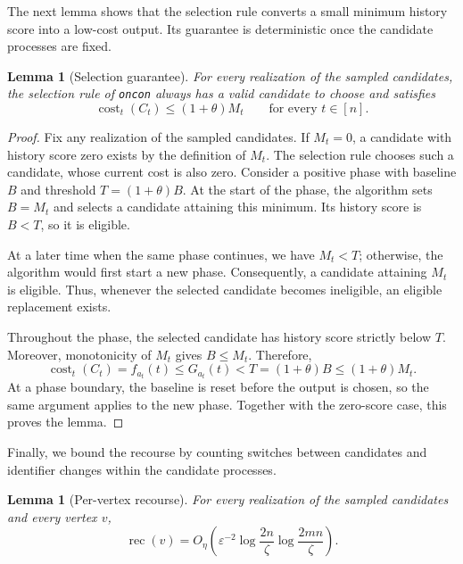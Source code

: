 \documentclass[11pt]{article}
\newtheorem{lemma}[theorem]{Lemma}
\theoremstyle{definition}
\theoremstyle{remark}
\newcommand{\cost}{\operatorname{cost}}
\newcommand{\1}{\mathbf{1}}
\begin{document}
The next lemma shows that the selection rule converts a small
minimum history score into a low-cost output. Its guarantee is
deterministic once the candidate processes are fixed.

\begin{lemma}[Selection guarantee]
\label{lem:oncon-selection}
For every realization of the sampled candidates, the selection
rule of \texttt{oncon} always has a valid candidate to choose and
satisfies
\[
    \cost_t(C_t)\leq(1+\theta)M_t
    \qquad\text{for every }t\in[n].
\]
\end{lemma}

\begin{proof}
Fix any realization of the sampled candidates. If $M_t=0$, a candidate with history score zero exists by the
definition of $M_t$. The selection rule chooses such a candidate,
whose current cost is also zero. Consider a positive phase with baseline $B$ and threshold
$T=(1+\theta)B$. At the start of the phase, the algorithm sets
$B=M_t$ and selects a candidate attaining this minimum. Its history
score is $B<T$, so it is eligible.

At a later time when the same phase continues, we have $M_t<T$;
otherwise, the algorithm would first start a new phase.
Consequently, a candidate attaining $M_t$ is eligible. Thus,
whenever the selected candidate becomes ineligible, an eligible
replacement exists.

Throughout the phase, the selected candidate has history score
strictly below $T$. Moreover, monotonicity of $M_t$ gives $B\leq M_t$.
Therefore,
\[
    \cost_t(C_t)
    =
    f_{a_t}(t)
    \leq
    G_{a_t}(t)
    <
    T
    =
    (1+\theta)B
    \leq
    (1+\theta)M_t.
\]
At a phase boundary, the baseline is reset before the output is
chosen, so the same argument applies to the new phase. Together
with the zero-score case, this proves the lemma.
\end{proof}

Finally, we bound the recourse by counting switches between
candidates and identifier changes within the candidate processes.

\begin{lemma}[Per-vertex recourse]
\label{lem:oncon-recourse}
For every realization of the sampled candidates and every vertex $v$,
\[
    \operatorname{rec}(v)
    =
    O_{\eta}\!\left(
        \varepsilon^{-2}
        \log\frac{2n}{\zeta}
        \log\frac{2mn}{\zeta}
    \right).
\]
\end{lemma}
\end{document}
